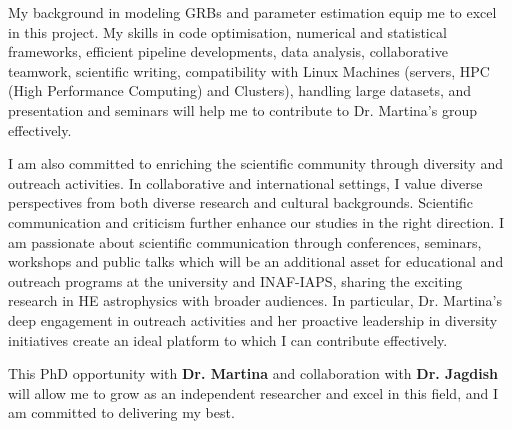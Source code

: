 \vspace{0.10 cm}

My background in modeling GRBs and parameter estimation equip me to excel in this project. My skills in code optimisation, numerical and statistical frameworks, efficient pipeline developments, data analysis, collaborative teamwork, scientific writing, compatibility with Linux Machines (servers, HPC (High Performance Computing) and Clusters), handling large datasets, and presentation and seminars will help me to contribute to Dr. Martina's group effectively.

\vspace{0.3cm}

\vspace{0.10 cm}
I am also committed to enriching the scientific community through diversity and outreach activities. In collaborative and international settings, I value diverse perspectives from both diverse research and cultural backgrounds. Scientific communication and criticism further enhance our studies in the right direction. I am passionate about scientific communication through conferences, seminars, workshops and public talks which will be an additional asset for educational and outreach programs at the university and INAF-IAPS, sharing the exciting research in HE astrophysics with broader audiences. In particular, Dr. Martina’s deep engagement in outreach activities and her proactive leadership in diversity initiatives create an ideal platform to which I can contribute effectively.

\vspace{0.3cm}

This PhD opportunity with \textbf{Dr. Martina} and collaboration with \textbf{Dr. Jagdish} will allow me to grow as an independent researcher and excel in this field, and I am committed to delivering my best.



